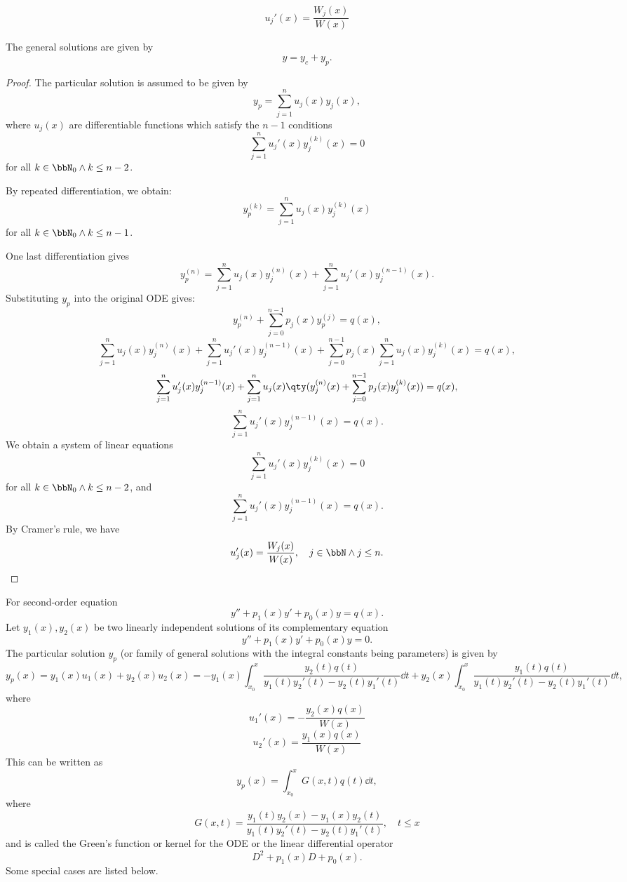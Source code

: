\documentclass[a4paper,12pt]{report}
\begin{document}
\[u_j'(x)=\frac{W_j(x)}{W(x)}\]
\item The general solutions are given by
\[y=y_c+y_p.\]
\een
\begin{proof}
The particular solution is assumed to be given by
\[y_p=\sum_{j=1}^nu_j(x)y_j(x),\]
where $u_j(x)$ are differentiable functions which satisfy the $n-1$ conditions
\[\sum_{j=1}^nu_j'(x)y_j^{(k)}(x)=0\]
for all $k\in\bbN_0\land k\leq n-2$.

By repeated differentiation, we obtain:
\[y_p^{(k)}=\sum_{j=1}^nu_j(x)y_j^{(k)}(x)\]
for all $k\in\bbN_0\land k\leq n-1$.

One last differentiation gives
\[y_p^{(n)}=\sum_{j=1}^nu_j(x)y_j^{(n)}(x)+\sum_{j=1}^nu_j'(x)y_j^{(n-1)}(x).\]
Substituting $y_p$ into the original ODE gives:
\[y_p^{(n)}+\sum_{j=0}^{n-1}p_j(x)y_p^{(j)}=q(x),\]
\[\sum_{j=1}^nu_j(x)y_j^{(n)}(x)+\sum_{j=1}^nu_j'(x)y_j^{(n-1)}(x)+\sum_{j=0}^{n-1}p_j(x)\sum_{j=1}^nu_j(x)y_j^{(k)}(x)=q(x),\]
\[\sum_{j=1}^nu_j'(x)y_j^{(n-1)}(x)+\sum_{j=1}^nu_j(x)\qty(y_j^{(n)}(x)+\sum_{j=0}^{n-1}p_j(x)y_j^{(k)}(x))=q(x),\]
\[\sum_{j=1}^nu_j'(x)y_j^{(n-1)}(x)=q(x).\]
We obtain a system of linear equations
\[\sum_{j=1}^nu_j'(x)y_j^{(k)}(x)=0\]
for all $k\in\bbN_0\land k\leq n-2$, and
\[\sum_{j=1}^nu_j'(x)y_j^{(n-1)}(x)=q(x).\]
By Cramer's rule, we have
\[u_j'(x)=\frac{W_j(x)}{W(x)},\quad j\in\bbN\land j\leq n.\]
\end{proof}
For second-order equation
\[y''+p_1(x)y'+p_0(x)y=q(x).\]
Let $y_1(x),y_2(x)$ be two linearly independent solutions of its complementary equation
\[y''+p_1(x)y'+p_0(x)y=0.\]
The particular solution $y_p$ (or family of general solutions with the integral constants being parameters) is given by
\[y_p(x)=y_1(x)u_1(x)+y_2(x)u_2(x)=-y_1(x)\int_{x_0}^x\frac{y_2(t)q(t)}{y_1(t)y_2'(t)-y_2(t)y_1'(t)}\dd{t}+y_2(x)\int_{x_0}^x\frac{y_1(t)q(t)}{y_1(t)y_2'(t)-y_2(t)y_1'(t)}\dd{t},\]
where
\[u_1'(x)=-\frac{y_2(x)q(x)}{W(x)}\]
\[u_2'(x)=\frac{y_1(x)q(x)}{W(x)}\]
This can be written as
\[y_p(x)=\int_{x_0}^xG(x,t)q(t)\dd{t},\]
where
\[G(x,t)=\frac{y_1(t)y_2(x)-y_1(x)y_2(t)}{y_1(t)y_2'(t)-y_2(t)y_1'(t)},\quad t\le x\]
and is called the Green's function or kernel for the ODE or the linear differential operator
\[D^2+p_1(x)D+p_0(x).\]
Some special cases are listed below.
\end{document}
